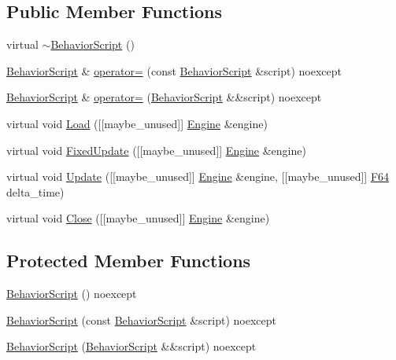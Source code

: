 \subsection*{Public Member Functions}
\begin{DoxyCompactItemize}
\item 
virtual \hyperlink{classmage_1_1_behavior_script_a61e4825ba0fc7746d49faa44ed7bc481}{$\sim$\+Behavior\+Script} ()
\item 
\hyperlink{classmage_1_1_behavior_script}{Behavior\+Script} \& \hyperlink{classmage_1_1_behavior_script_adb153676123adadacf023e4f3804abf5}{operator=} (const \hyperlink{classmage_1_1_behavior_script}{Behavior\+Script} \&script) noexcept
\item 
\hyperlink{classmage_1_1_behavior_script}{Behavior\+Script} \& \hyperlink{classmage_1_1_behavior_script_aefeae227ee8d2452bf05782604f5011e}{operator=} (\hyperlink{classmage_1_1_behavior_script}{Behavior\+Script} \&\&script) noexcept
\item 
virtual void \hyperlink{classmage_1_1_behavior_script_ae7864876b2ffb1d1d8d8a56e3099f1f2}{Load} (\mbox{[}\mbox{[}maybe\+\_\+unused\mbox{]}\mbox{]} \hyperlink{classmage_1_1_engine}{Engine} \&engine)
\item 
virtual void \hyperlink{classmage_1_1_behavior_script_ae4b9cb7f3ee9f96d69682aef42f8bb12}{Fixed\+Update} (\mbox{[}\mbox{[}maybe\+\_\+unused\mbox{]}\mbox{]} \hyperlink{classmage_1_1_engine}{Engine} \&engine)
\item 
virtual void \hyperlink{classmage_1_1_behavior_script_a1211b9f6a3cdc79ea6cd5fa0344a31c8}{Update} (\mbox{[}\mbox{[}maybe\+\_\+unused\mbox{]}\mbox{]} \hyperlink{classmage_1_1_engine}{Engine} \&engine, \mbox{[}\mbox{[}maybe\+\_\+unused\mbox{]}\mbox{]} \hyperlink{namespacemage_ad26233bbec640deda836e572c1a23708}{F64} delta\+\_\+time)
\item 
virtual void \hyperlink{classmage_1_1_behavior_script_a5a8d2d38b369e193bf8cc20a74708397}{Close} (\mbox{[}\mbox{[}maybe\+\_\+unused\mbox{]}\mbox{]} \hyperlink{classmage_1_1_engine}{Engine} \&engine)
\end{DoxyCompactItemize}
\subsection*{Protected Member Functions}
\begin{DoxyCompactItemize}
\item 
\hyperlink{classmage_1_1_behavior_script_adbe64d10ebd511f05af9e0930e245913}{Behavior\+Script} () noexcept
\item 
\hyperlink{classmage_1_1_behavior_script_a0f3baaa9549ab272f0711c06d33ad223}{Behavior\+Script} (const \hyperlink{classmage_1_1_behavior_script}{Behavior\+Script} \&script) noexcept
\item 
\hyperlink{classmage_1_1_behavior_script_abae69e797a05fa2cd1c3b7704f1c6767}{Behavior\+Script} (\hyperlink{classmage_1_1_behavior_script}{Behavior\+Script} \&\&script) noexcept
\end{DoxyCompactItemize}


